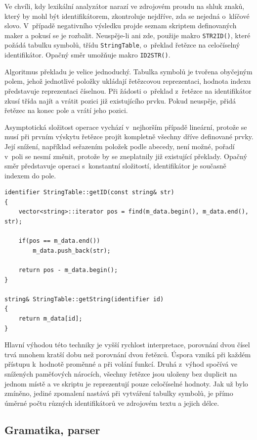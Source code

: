 \documentclass[11pt,twoside,a4paper]{book}
\begin{document}
Ve chvíli, kdy lexikální analyzátor narazí ve zdrojovém proudu na shluk znaků, který by mohl být identifikátorem, zkontroluje nejdříve, zda se nejedná o~klíčové slovo. V~případě negativního výsledku projde seznam skriptem definovaných maker a pokusí se je rozbalit. Neuspěje-li ani zde, použije makro \texttt{STR2ID()}, které požádá tabulku symbolů, třídu \texttt{StringTable}, o~překlad řetězce na celočíselný identifikátor. Opačný směr umožňuje makro \texttt{ID2STR()}.

Algoritmus překladu je velice jednoduchý. Tabulka symbolů je tvořena obyčejným polem, jehož jednotlivé položky ukládají řetězcovou reprezentaci, hodnota indexu představuje reprezentaci číselnou. Při žádosti o~překlad z~řetězce na identifikátor zkusí třída najít a vrátit pozici již existujícího prvku. Pokud neuspěje, přidá řetězec na konec pole a vrátí jeho pozici.

Asymptotická složitost operace vychází v~nejhorším případě lineární, protože se musí při prvním výskytu řetězce projít kompletně všechny dříve definované prvky. Její snížení, na\-pří\-klad seřazením položek podle abecedy, není možné, pořadí v~poli se nesmí změnit, protože by se zneplatnily již existující překlady. Opačný směr představuje operaci s~konstantní složitostí, identifikátor je současně indexem do pole.

\begin{verbatim}
identifier StringTable::getID(const string& str)
{
    vector<string>::iterator pos = find(m_data.begin(), m_data.end(), str);

    if(pos == m_data.end())
        m_data.push_back(str);

    return pos - m_data.begin();
}

string& StringTable::getString(identifier id)
{
    return m_data[id];
}
\end{verbatim}

Hlavní výhodou této techniky je vyšší rychlost interpretace, porovnání dvou čísel trvá mnohem kratší dobu než porovnání dvou řetězců. Úspora vzniká při každém přístupu k~hodnotě proměnné a při volání funkcí. Druhá z~výhod spočívá ve snížených paměťových nárocích, všechny řetězce jsou uloženy bez duplicit na jednom místě a ve skriptu je reprezentují pouze celočíselné hodnoty. Jak už bylo zmíněno, jediné zpomalení nastává při vytváření tabulky symbolů, je přímo úměrné počtu různých identifikátorů ve zdrojovém textu a jejich délce.


\subsection{Gramatika, parser}
\end{document}
